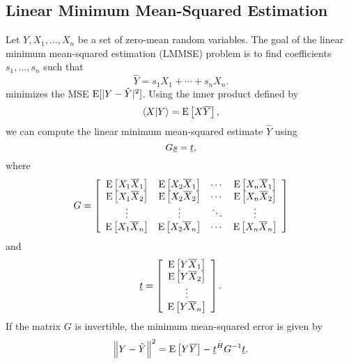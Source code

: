 \subsection{Linear Minimum Mean-Squared Estimation}

Let $Y, X_1, \ldots, X_n$ be a set of zero-mean random variables.
The goal of the linear minimum mean-squared estimation (LMMSE) problem is to find coefficients $s_1, \ldots, s_n$ such that
\[ \hat{Y} = s_1 X_1 + \cdots + s_n X_n. \]
minimizes the MSE $\mathrm{E}[|Y-\hat{Y}|^2]$.
Using the inner product defined by
\begin{equation} \label{equation:ExpectationInnerProduct}
\left\langle X | Y \right\rangle = \mathrm{E} \left[ X \overline{Y} \right],
\end{equation}
we can compute the linear minimum mean-squared estimate $\hat{Y}$ using
\begin{equation*}
G \underline{s} = \underline{t},
\end{equation*}
where
\begin{equation*}
G = \left[ \begin{array}{cccc}
\mathrm{E} \left[ X_1 \overline{X}_1 \right]
& \mathrm{E} \left[ X_2 \overline{X}_1 \right] & \cdots
& \mathrm{E} \left[ X_n \overline{X}_1 \right] \\
\mathrm{E} \left[ X_1 \overline{X}_2 \right]
& \mathrm{E} \left[ X_2 \overline{X}_2 \right] & \cdots
& \mathrm{E} \left[ X_n \overline{X}_2 \right] \\
\vdots & \vdots & \ddots & \vdots \\
\mathrm{E} \left[ X_1 \overline{X}_n \right]
& \mathrm{E} \left[ X_2 \overline{X}_n \right] & \cdots
& \mathrm{E} \left[ X_n \overline{X}_n \right] \\
\end{array} \right]
\end{equation*}
and
\begin{equation*}
\underline{t} = \left[ \begin{array}{c}
\mathrm{E} \left[ Y \overline{X}_1 \right] \\
\mathrm{E} \left[ Y \overline{X}_2 \right] \\ \vdots \\
\mathrm{E} \left[ Y \overline{X}_n \right] \end{array} \right] .
\end{equation*}
If the matrix $G$ is invertible, the minimum mean-squared error is given by
\begin{equation*}
\left\| Y - \hat{Y} \right\|^2 = \mathrm{E} \left[ Y \overline{Y} \right]
- \underline{t}^H G^{-1} \underline{t} .
\end{equation*}


